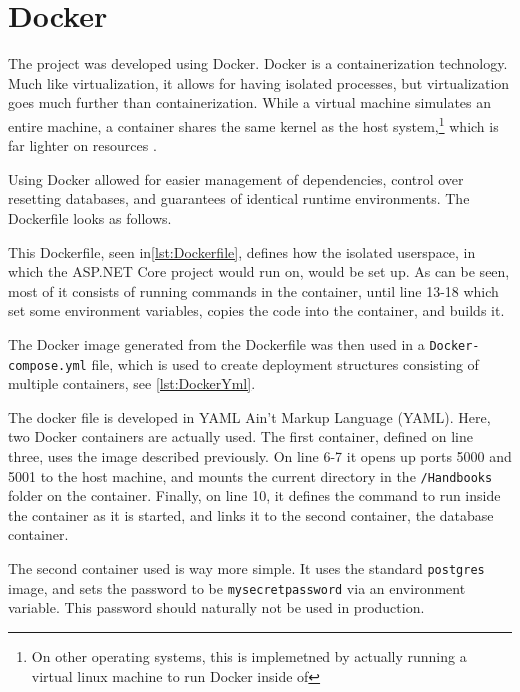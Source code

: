\section{Docker}
The project was developed using Docker.
Docker is a containerization technology.
Much like virtualization, it allows for having isolated processes, but virtualization goes much further than containerization.
While a virtual machine simulates an entire machine, a container shares the same kernel as the host system,\footnote{On other operating systems, this is implemetned by actually running a virtual linux machine to run Docker inside of} which is far lighter on resources \cite{docker}.

Using Docker allowed for easier management of dependencies, control over resetting databases, and guarantees of identical runtime environments.
The Dockerfile looks as follows.

This Dockerfile, seen in\cref{lst:Dockerfile}, defines how the isolated userspace, in which the ASP.NET Core project would run on, would be set up.
As can be seen, most of it consists of running commands in the container, until line 13-18 which set some environment variables, copies the code into the container, and builds it.

The Docker image generated from the Dockerfile was then used in a \texttt{Docker-compose.yml} file, which is used to create deployment structures consisting of multiple containers, see \cref{lst:DockerYml}.

The docker file is developed in YAML Ain't Markup Language (YAML).
Here, two Docker containers are actually used.
The first container, defined on line three, uses the image described previously.
On line 6-7 it opens up ports 5000 and 5001 to the host machine, and mounts the current directory in the \texttt{/Handbooks} folder on the container.
Finally, on line 10, it defines the command to run inside the container as it is started, and links it to the second container, the database container.

The second container used is way more simple.
It uses the standard \texttt{postgres} image, and sets the password to be \texttt{mysecretpassword} via an environment variable.
This password should naturally not be used in production.
